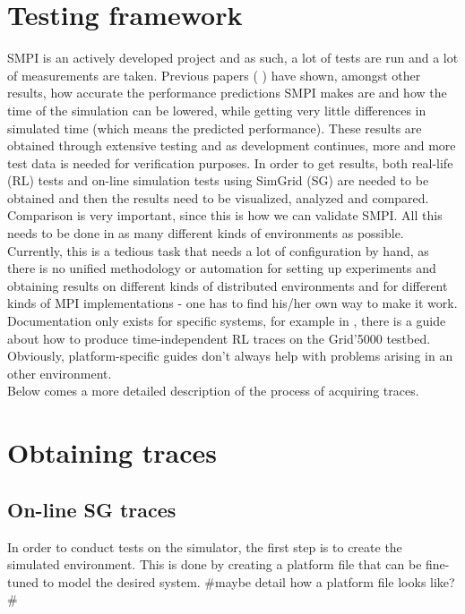 \section{Testing framework}
SMPI is an actively developed project and as such, a lot of tests are
run and a lot of measurements are taken. Previous papers
(\cite{csgscq11} \cite{bdglmqssv13}) have shown, amongst other
results, how accurate the performance predictions SMPI makes are and
how the time of the simulation can be lowered, while getting very
little differences in simulated time (which means the predicted
performance). These results are obtained through extensive testing and
as development continues, more and more test data is needed for
verification purposes. In order to get results, both
real-life (RL) tests and on-line simulation tests using SimGrid (SG)
are needed to be obtained and then the results need to be visualized,
analyzed and compared. Comparison is very important, since this is how
we can validate SMPI. All this needs to be done in as many different
kinds of environments as possible. Currently, this is a tedious task
that needs a lot of configuration by hand, as there is no unified
methodology or automation for setting up experiments and obtaining
results on
different kinds of distributed environments and for different kinds of
MPI implementations - one has to find his/her own way to make it
work. Documentation only exists for specific systems, for example in
\cite{ms11}, there is a guide about how to produce time-independent RL
traces on the Grid'5000 testbed. Obviously, platform-specific guides
don't always help with problems arising in an other environment.\\
Below comes a more detailed description of the process of acquiring
traces.
\section{Obtaining traces}
\subsection{On-line SG traces}
In order to conduct tests on the simulator, the first step is to
create the simulated environment. This is done by creating a platform
file that can be fine-tuned to model the desired system. \#maybe
detail how a platform file looks like?\#
